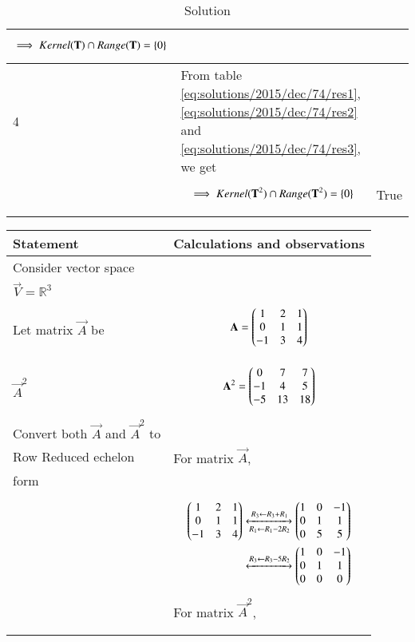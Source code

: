 \begin{longtable}{|l|l|l|}
{\begin{align}
    \implies Kernel(\mathbf{T})\cap Range(\mathbf{T})=\left\{0\right\}\label{eq:solutions/2015/dec/74/res3}
\end{align}}&\\
\hline
4&From table \eqref{eq:solutions/2015/dec/74/res1}, \eqref{eq:solutions/2015/dec/74/res2} and \eqref{eq:solutions/2015/dec/74/res3}, we get&\\&\parbox{13cm}{\begin{align}
    \implies Kernel(\mathbf{T}^2)\cap Range(\mathbf{T}^2)=\left\{0\right\}
\end{align}}&True\\
\hline
\caption{Solution}
\label{eq:solutions/2015/dec/74/sol}
\end{longtable}
\begin{longtable}{|l|l|}
\hline
\endhead
\textbf{Statement}&\textbf{Calculations and observations}\\
\hline
Consider vector space&\\$\vec{V}=\mathbb{R}^3$&\\
Let matrix $\vec{A}$ be&\parbox{11cm}{\begin{align}
    \mathbf{A}=\begin{pmatrix}1&2&1\\0&1&1\\-1&3&4\end{pmatrix}
\end{align}}\\
\hline$\vec{A}^2$&\parbox{11cm}{\begin{align}
    \mathbf{A}^2=\begin{pmatrix}0&7&7\\-1&4&5\\-5&13&18\end{pmatrix}
\end{align}}\\
\hline 
Convert both $\vec{A}$ and $\vec{A}^2$ to&\\Row Reduced echelon&For matrix $\vec{A}$,\\form&\\&\parbox{11cm}{\begin{align}
    \begin{pmatrix}1&2&1\\0&1&1\\-1&3&4\end{pmatrix}&\xleftrightarrow[R_1\leftarrow R_1-2R_2]{R_3\leftarrow R_3+R_1}\begin{pmatrix}1&0&-1\\0&1&1\\0&5&5\end{pmatrix}\\&\xleftrightarrow{R_3\leftarrow R_3-5R_2}\begin{pmatrix}1&0&-1\\0&1&1\\0&0&0\end{pmatrix}\label{eq:solutions/2015/dec/74/Aref}
\end{align}}\\&For matrix $\vec{A}^2$,\\&\parbox{11cm}{\begin{align}

\end{align}}
\end{longtable}
